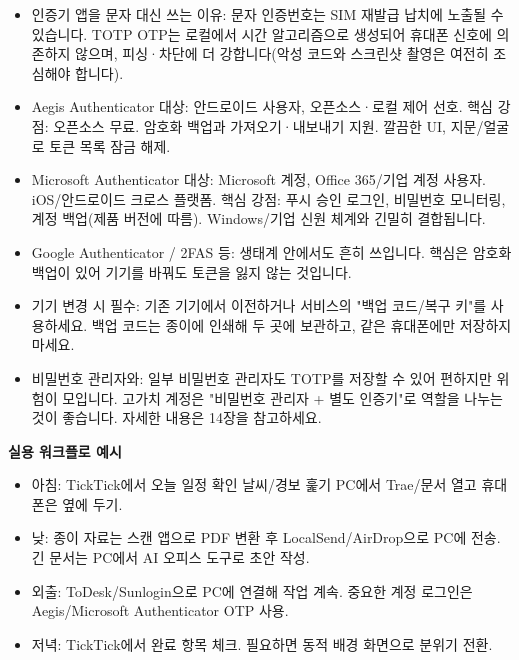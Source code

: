
\begin{itemize}
  \item 인증기 앱을 문자 대신 쓰는 이유: 문자 인증번호는 SIM 재발급 납치에 노출될 수 있습니다. TOTP OTP는 로컬에서 시간 알고리즘으로 생성되어 휴대폰 신호에 의존하지 않으며, 피싱·차단에 더 강합니다(악성 코드와 스크린샷 촬영은 여전히 조심해야 합니다).
  \item Aegis Authenticator 대상: 안드로이드 사용자, 오픈소스·로컬 제어 선호. 핵심 강점: 오픈소스 무료. 암호화 백업과 가져오기·내보내기 지원. 깔끔한 UI, 지문/얼굴로 토큰 목록 잠금 해제.
  \item Microsoft Authenticator 대상: Microsoft 계정, Office 365/기업 계정 사용자. iOS/안드로이드 크로스 플랫폼. 핵심 강점: 푸시 승인 로그인, 비밀번호 모니터링, 계정 백업(제품 버전에 따름). Windows/기업 신원 체계와 긴밀히 결합됩니다.
  \item Google Authenticator / 2FAS 등: 생태계 안에서도 흔히 쓰입니다. 핵심은 암호화 백업이 있어 기기를 바꿔도 토큰을 잃지 않는 것입니다.
  \item 기기 변경 시 필수: 기존 기기에서 이전하거나 서비스의 "백업 코드/복구 키"를 사용하세요. 백업 코드는 종이에 인쇄해 두 곳에 보관하고, 같은 휴대폰에만 저장하지 마세요.
  \item 비밀번호 관리자와: 일부 비밀번호 관리자도 TOTP를 저장할 수 있어 편하지만 위험이 모입니다. 고가치 계정은 "비밀번호 관리자 + 별도 인증기"로 역할을 나누는 것이 좋습니다. 자세한 내용은 14장을 참고하세요.
\end{itemize}


\textbf{실용 워크플로 예시}\par

\begin{itemize}
  \item 아침: TickTick에서 오늘 일정 확인 날씨/경보 훑기 PC에서 Trae/문서 열고 휴대폰은 옆에 두기.
  \item 낮: 종이 자료는 스캔 앱으로 PDF 변환 후 LocalSend/AirDrop으로 PC에 전송. 긴 문서는 PC에서 AI 오피스 도구로 초안 작성.
  \item 외출: ToDesk/Sunlogin으로 PC에 연결해 작업 계속. 중요한 계정 로그인은 Aegis/Microsoft Authenticator OTP 사용.
  \item 저녁: TickTick에서 완료 항목 체크. 필요하면 동적 배경 화면으로 분위기 전환.
\end{itemize}

